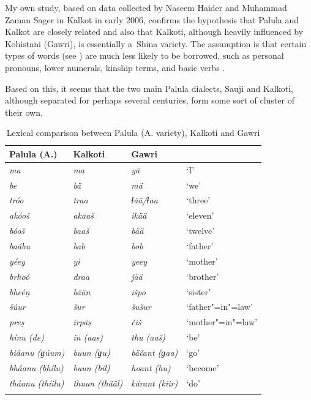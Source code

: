 My own study, based on data collected by Naseem Haider and Muhammad Zaman Sager in Kalkot in early 2006, confirms the hypothesis that Palula and Kalkot are closely related and also that Kalkoti, although heavily influenced by Kohistani (Gawri), is essentially a~Shina variety. The assumption is that certain types of words (see ) are much less likely to be borrowed, such as personal pronouns, lower numerals, kinship terms, and basic verbs \citep[23]{trask1996}.


Based on this, it seems that the two main Palula dialects, Sauji and Kalkoti, although separated for perhaps several centuries, form some sort of cluster of their own.


\begin{table}[ht]
\caption{Lexical comparison between Palula (A. variety), Kalkoti and Gawri}
\begin{tabularx}{\textwidth}{ Q Q Q Q }
\lsptoprule
Palula (A.) &
Kalkoti &
Gawri &
\\\hline
\textit{ma} &
\textit{ma} &
\textit{yä} &
`I'\\
\textit{be} &
\textit{bä} &
\textit{mä} &
`we'\\
\textit{tróo} &
\textit{traa} &
\textit{ɬää/‌ɬaa} &
`three'\\
\textit{akóoš} &
\textit{akaaš} &
\textit{ikää} &
`eleven'\\
\textit{bóoš} &
\textit{baaš} &
\textit{bää} &
`twelve'\\
\textit{baábu} &
\textit{bab} &
\textit{bob} &
`father'\\
\textit{yéey} &
\textit{yi} &
\textit{yeey} &
`mother'\\
\textit{brhoó} &
\textit{draa} &
\textit{ǰää} &
`brother'\\
\textit{bheéṇ} &
\textit{bään} &
\textit{išpo} &
`sister'\\
\textit{šúur} &
\textit{šur} &
\textit{šušur} &
`father"=in"=law'\\
\textit{preṣ} &
\textit{irpäṣ} &
\textit{čiš} &
`mother"=in"=law'\\
\textit{hínu (de)} &
\textit{in (aas)} &
\textit{thu (aaš)} &
`be'\\
\textit{biáanu (ɡúum)} &
\textit{buun (ɡu)} &
\textit{bäčant (ɡaa)} &
`go'\\
\textit{bháanu (bhílu)} &
\textit{buun (bil)} &
\textit{hoant (hu)} &
`become'\\
\textit{tháanu (thíilu)} &
\textit{thuun (thääl)} &
\textit{kärant (kiir)} &
`do'\\\lspbottomrule
\end{tabularx}
\label{tab:1-3}
\end{table}



